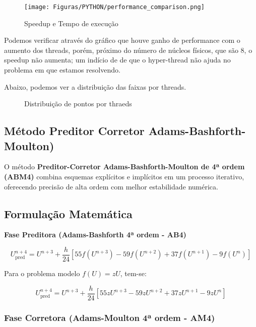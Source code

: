 \documentclass[a4paper,12pt]{article}
\begin{document}
\begin{figure}[H]
   \centering
   \texttt{[image: Figuras/PYTHON/performance\_comparison.png]}
   \caption{Speedup e Tempo de execução}
   \label{fig:speed_threads}
\end{figure}

Podemos verificar através do gráfico que houve ganho de performance com o aumento dos threads, porém, próximo do número de núcleos físicos, que são 8, o speedup não aumenta; um indício de de que o hyper-thread não ajuda no problema em que estamos resolvendo. 

Abaixo, podemos ver a distribuição das faixas por threads. 
\begin{figure}[H]
\centering
{} %
\quad %
\caption{Distribuição de pontos por thraeds}
\label{fig:euler_implicito_parallel}
\end{figure}

\subsection{Método Preditor Corretor \textbf{Adams-Bashforth-Moulton})}

O método \textbf{Preditor-Corretor Adams-Bashforth-Moulton de 4ª ordem (ABM4)} combina esquemas explícitos e implícitos em um processo iterativo, oferecendo precisão de alta ordem com melhor estabilidade numérica.

\subsection{Formulação Matemática}

\textbf{Fase Preditora (Adams-Bashforth 4ª ordem - AB4)}

\[
U^{n+4}_{\text{pred}} = U^{n+3} + \frac{h}{24}\left[55f(U^{n+3}) - 59f(U^{n+2}) + 37f(U^{n+1}) - 9f(U^n)\right]
\]

Para o problema modelo $f(U) = zU$, tem-se:

\[
U^{n+4}_{\text{pred}} = U^{n+3} + \frac{h}{24}\left[55zU^{n+3} - 59zU^{n+2} + 37zU^{n+1} - 9zU^n\right]
\]

\subsubsection{Fase Corretora (Adams-Moulton 4ª ordem - AM4)}
\end{document}
